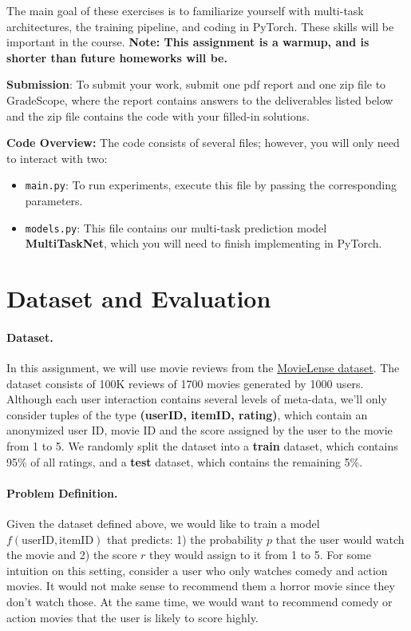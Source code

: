 \documentclass[12pt]{article}
\begin{document}
\vspace{0.2cm}
\noindent The main goal of these exercises is to familiarize yourself with multi-task architectures, the training pipeline, and coding in PyTorch. These skills will be important in the course. \textbf{Note: This assignment is a warmup, and is shorter than future homeworks will be.}

\vspace{0.2cm}

\noindent\textbf{Submission}: To submit your work, submit one pdf report and one zip file to GradeScope, where the report contains answers to the deliverables listed below and the zip file contains the code with your filled-in solutions. 

\vspace{0.2cm}

\noindent\textbf{Code Overview:} The code consists of several files; however, you will only need to interact with two:

\begin{itemize}
    \item \texttt{main.py}: To run experiments, execute this file by passing the corresponding parameters. 
    \item \texttt{models.py}: This file contains our multi-task prediction model \textbf{MultiTaskNet}, which you will need to finish implementing in PyTorch.
\end{itemize}


\section{Dataset and Evaluation}

\paragraph{Dataset.} In this assignment, we will use movie reviews from the \href{https://grouplens.org/datasets/movielens/100k}{MovieLense dataset}. The dataset consists of 100K reviews of 1700 movies generated by 1000 users. Although each user interaction contains several levels of meta-data, we'll only consider tuples of the type \textbf{(userID, itemID, rating)}, which contain an anonymized user ID, movie ID and the score assigned by the user to the movie from 1 to 5. We randomly split the dataset into a \textbf{train} dataset, which contains 95\% of all ratings, and a \textbf{test} dataset, which contains the remaining 5\%.

\paragraph{Problem Definition.}
Given the dataset defined above, we would like to train a model $f(\text{userID}, \text{itemID})$ that predicts: 1) the probability $p$ that the user would watch the movie and 2) the score $r$ they would assign to it from 1 to 5. For some intuition on this setting, consider a user who only watches comedy and action movies. It would not make sense to recommend them a horror movie since they don't watch those. At the same time, we would want to recommend comedy or action movies that the user is likely to score highly. 
\end{document}
